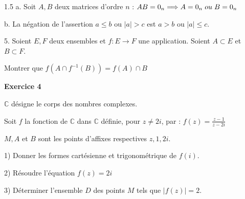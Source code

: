 \documentclass[12pt]{article}
\begin{document}
\begin{spacing}{1.5}
a. Soit $A,B$ deux matrices d'ordre $n$ : $AB=0_n\Longrightarrow A=0_n \hspace{0.1cm} ou \hspace{0.1cm} B=0_n$

b. La négation de l'assertion  $a\leq b$ ou $\mid a\mid> c$ est $a>b$ ou $\mid a\mid\leq c$.

5. Soient $E,F$ deux ensembles et $f:E\longrightarrow F$ une application. Soient $A\subset E$ et $B\subset F$.

Montrer que $f(A\cap f^{-1}(B))=f(A)\cap B$

\medskip\textbf{Exercice 4}

$\mathbb{C}$ désigne le corps des nombres complexes. 

Soit $f$ la fonction de $\mathbb{C}$ dans $\mathbb{C}$ définie, pour $z\neq 2i$, par : 
$f(z) = \frac{z -1}{z -2i}$

$M, A $ et $ B$ sont les points d'affixes respectives $z, 1, 2i$. 

1) Donner les formes cartésienne et trigonométrique de $f(i)$. 

2) Résoudre l'équation $f(z) = 2i$ 

3) Déterminer l'ensemble $D$ des points $M$ tels que $\mid f(z) \mid = 2$.

\quad
\quad

\end{spacing}
\end{document}
